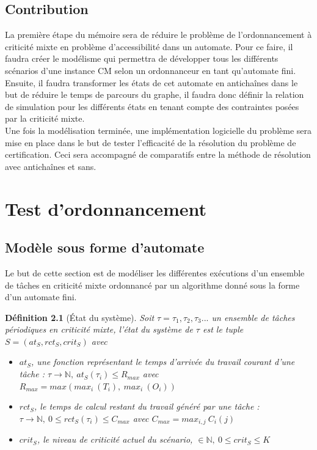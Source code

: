 \documentclass[a4paper]{report}
\theoremstyle{break}
\newtheorem{defin}{Définition}
\begin{document}
\section{Contribution}

La première étape du mémoire sera de réduire le problème de l'ordonnancement à criticité mixte en problème d'accessibilité dans un automate. Pour ce faire, il faudra créer le modélisme qui permettra de développer tous les différents scénarios d'une instance CM selon un ordonnanceur en tant qu'automate fini.\\

Ensuite, il faudra transformer les états de cet automate en antichaînes dans le but de réduire le temps de parcours du graphe, il faudra donc définir la relation de simulation pour les différents états en tenant compte des contraintes posées par la criticité mixte.\\

Une fois la modélisation terminée, une implémentation logicielle du problème sera mise en place dans le but de tester l'efficacité de la résolution du problème de certification. Ceci sera accompagné de comparatifs entre la méthode de résolution avec antichaînes et sans.


\chapter{Test d'ordonnancement}

\section{Modèle sous forme d'automate}

Le but de cette section est de modéliser les différentes exécutions d'un ensemble de tâches en criticité mixte ordonnancé par un algorithme donné sous la forme d'un automate fini.\\

\begin{defin}[État du système]
Soit $\tau = \tau_1, \tau_2, \tau_3 ...$ un ensemble de tâches périodiques en criticité mixte, l'état du système de $\tau$ est le tuple $S = (at_S, rct_S, crit_S)$ avec

\begin{itemize}
\item $at_S$, une fonction représentant le temps d'arrivée du travail courant d'une tâche : $\tau \rightarrow \mathbb{N},\ at_S(\tau_i) \leq R_{max}$ avec $R_{max} = max(max_i\ (T_i),\ max_i\ (O_i))$
\item $rct_S$, le temps de calcul restant du travail généré par une tâche : $ \tau \rightarrow \mathbb{N},\ 0 \leq rct_S(\tau_i) \leq C_{max}$ avec $C_{max} = max_{i,j}\ C_i(j)$
\item $crit_S$, le niveau de criticité actuel du scénario, $ \in \mathbb{N},\ 0 \leq crit_S \leq K$

\end{itemize}

\end{defin}
\end{document}
